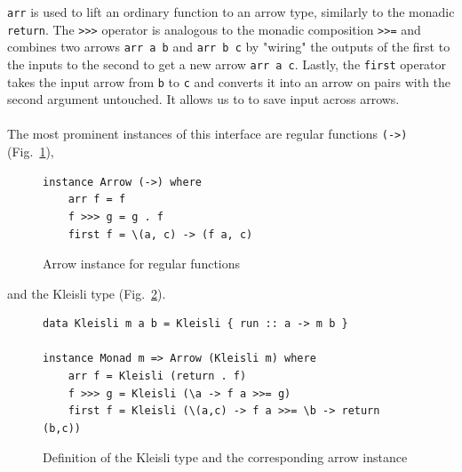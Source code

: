 \documentclass{jfp1}
\newcommand{\inlinecode}[1]{\texttt{#1}}
\begin{document}
\lstinline{arr} is used to lift an ordinary function to an arrow type, similarly to the monadic \lstinline{return}. The \lstinline{>>>} operator is analogous to the monadic composition  \lstinline{>>=} and combines two arrows \inlinecode{arr a b} and \inlinecode{arr b c} by "wiring" the outputs of the first to the inputs to the second to get a new arrow \inlinecode{arr a c}. Lastly, the \lstinline{first} operator  takes the input arrow from \lstinline{b} to \lstinline{c} and converts it into an arrow on pairs with the second argument untouched. It allows us to to save input across arrows.
\\\\
The most prominent instances of this interface are regular functions \lstinline{(->)} (Fig.~\ref{fig:arrowfn}),
\begin{figure}[h]
\begin{lstlisting}[frame=htrbl]
instance Arrow (->) where
	arr f = f
	f >>> g = g . f
	first f = \(a, c) -> (f a, c) 
\end{lstlisting}
\caption{Arrow instance for regular functions}
\label{fig:arrowfn}
\end{figure}
and the Kleisli type (Fig.~\ref{fig:arrowkleisli}).
\begin{figure}[h]
\begin{lstlisting}[frame=htrbl]
data Kleisli m a b = Kleisli { run :: a -> m b }

instance Monad m => Arrow (Kleisli m) where
	arr f = Kleisli (return . f)
	f >>> g = Kleisli (\a -> f a >>= g)
	first f = Kleisli (\(a,c) -> f a >>= \b -> return (b,c))
\end{lstlisting}%
\caption{Definition of the Kleisli type and the corresponding arrow instance}
\label{fig:arrowkleisli}
\end{figure}
\end{document}
